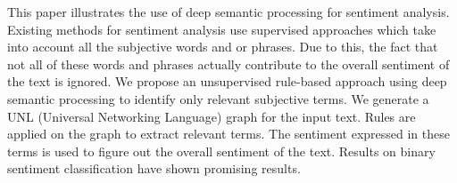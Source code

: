 This paper illustrates the use of deep semantic processing for sentiment analysis. Existing methods for sentiment analysis use supervised approaches which take into account all the subjective words and or phrases. Due to this, the fact that not all of these words and phrases actually contribute to the overall sentiment of the text is ignored. We propose an unsupervised rule-based approach using deep semantic processing to identify only relevant subjective terms. We generate a UNL (Universal Networking Language) graph for the input text. Rules are applied on the graph to extract relevant terms. The sentiment expressed in these terms is used to figure out the overall sentiment of the text. Results on binary sentiment classification have shown promising results.
